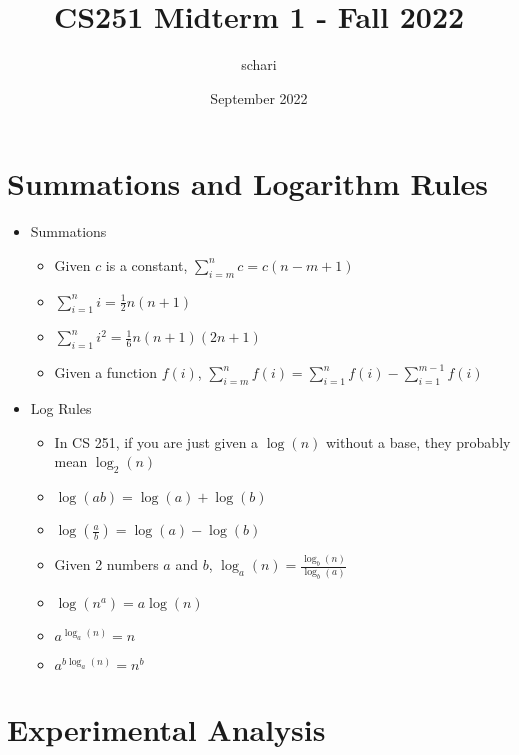\documentclass{article}
\title{CS251 Midterm 1 - Fall 2022}
\author{schari}
\date{September 2022}
\begin{document}
\maketitle

\section{Summations and Logarithm Rules}
\begin{itemize}
    \item Summations
        \begin{itemize}
            \item Given $c$ is a constant, $\sum_{i = m}^{n} c = c(n - m + 1)$
            \item $\sum_{i = 1}^{n} i = \frac{1}{2}n(n + 1)$
            \item $\sum_{i = 1}^{n} i^2 = \frac{1}{6}n(n + 1)(2n + 1)$
            \item Given a function $f(i)$, $\sum_{i = m}^{n} f(i) = \sum_{i = 1}^{n} f(i) - \sum_{i = 1}^{m - 1} f(i)$
        \end{itemize}
    \item Log Rules
        \begin{itemize}
            \item In CS 251, if you are just given a $\log(n)$ without a base, they probably mean $\log_2(n)$
            \item $\log(ab) = \log(a) + \log(b)$
            \item $\log(\frac{a}{b}) = \log(a) - \log(b)$
            \item Given 2 numbers $a$ and $b$, $\log_a(n) = \frac{\log_b(n)}{\log_b(a)}$
            \item $\log(n^a) = a \log(n)$
            \item $a^{\log_a(n)} = n$
            \item $a^{b \log_a(n)} = n^b$
        \end{itemize}
\end{itemize}

\section{Experimental Analysis}
\end{document}

